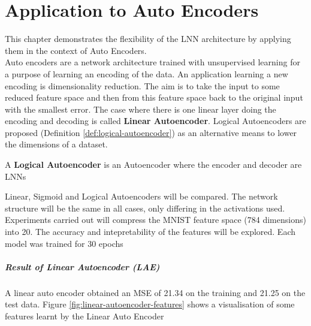 \chapter{Application to Auto Encoders} \label{C:lnn-application}
This chapter demonstrates the flexibility of the LNN architecture by applying them in the context of Auto Encoders. \\

Auto encoders \cite{baldi2012complex} \cite{hinton2006reducing} are a network architecture trained with unsupervised learning for a purpose of learning an encoding of the data. An application learning a new encoding is dimensionality reduction. The aim is to take the input to some reduced feature space and then from this feature space back to the original input with the smallest error. The case where there is one linear layer doing the encoding and decoding is called \textbf{Linear Autoencoder}. Logical Autoencoders are proposed (Definition \ref{def:logical-autoencoder}) as an alternative means to lower the dimensions of a dataset.

\begin{definition} \label{def:logical-autoencoder}
	A \textbf{Logical Autoencoder} is an Autoencoder where the encoder and decoder are LNNs
\end{definition}

Linear, Sigmoid and Logical Autoencoders will be compared. The network structure will be the same in all cases, only differing in the activations used. Experiments carried out will compress the MNIST feature space (784 dimensions) into 20. The accuracy and intepretability of the features will be explored. Each model was trained for 30 epochs

\paragraph{Result of Linear Autoencoder (LAE)}
A linear auto encoder obtained an MSE of 21.34 on the training and 21.25 on the test data. Figure \ref{fig:linear-autoencoder-features} shows a visualisation of some features learnt by the Linear Auto Encoder

